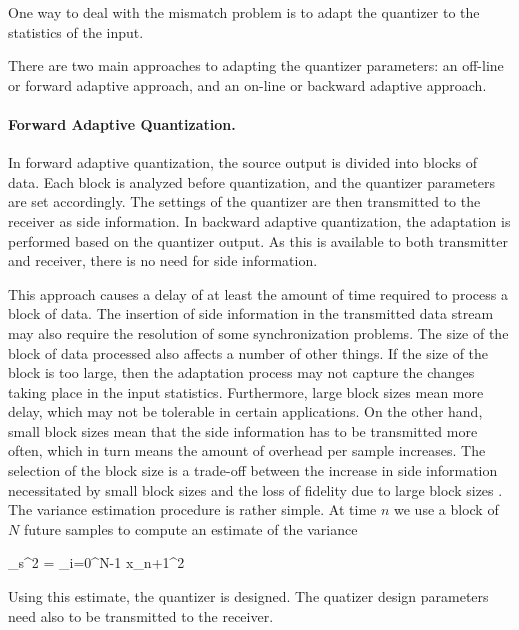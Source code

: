 One way to deal with the mismatch problem is to adapt the quantizer to the statistics of the input.

There are two main approaches to adapting the quantizer parameters: an off-line or forward adaptive approach, and an on-line or backward adaptive approach. 

\paragraph{Forward Adaptive Quantization.} In forward adaptive quantization, the source output is divided into blocks of data. Each block is analyzed before quantization, and the quantizer parameters are set accordingly. The settings of the quantizer are then transmitted to the receiver as side information. In backward adaptive quantization, the adaptation is performed based on the quantizer output. As this is available to both transmitter and receiver, there is no need for side information.

This approach causes a delay of at least the amount of time required to process a block of data. The insertion of side information in the transmitted data stream may also require the resolution of some synchronization problems. The size of the block of data processed also affects a number of other things. If the size of the block is too large, then the adaptation process may not capture the changes taking place in the input statistics. Furthermore, large block sizes mean more delay, which may not be tolerable in certain applications. On the other hand, small block sizes mean that the side information has to be transmitted more often, which in turn means the amount of overhead per sample increases. The selection of the block size is a trade-off between the increase in side information necessitated by small block sizes and the loss of fidelity due to large block sizes . The variance estimation procedure is rather simple. At time $n$ we use a block of $N$ future samples to compute an estimate of the variance

\bee
\sigma_s^2 =  \sum_{i=0}^{N-1} x_{n+1}^2
\eee

Using this estimate, the quantizer is designed. The quatizer design parameters need also to be transmitted to the receiver.

